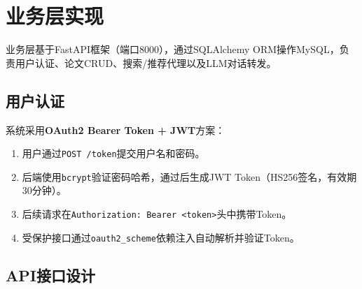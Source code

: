 \documentclass[12pt,a4paper]{ctexart}
\newcommand{\code}[1]{\texttt{#1}}
\newcommand{\api}[1]{\texttt{#1}}
\begin{document}
\section{业务层实现}

业务层基于FastAPI框架（端口8000），通过SQLAlchemy ORM操作MySQL，负责用户认证、论文CRUD、搜索/推荐代理以及LLM对话转发。

\subsection{用户认证}

系统采用\textbf{OAuth2 Bearer Token + JWT}方案：

\begin{enumerate}
\item 用户通过\api{POST /token}提交用户名和密码。
\item 后端使用\code{bcrypt}验证密码哈希，通过后生成JWT Token（HS256签名，有效期30分钟）。
\item 后续请求在\code{Authorization: Bearer <token>}头中携带Token。
\item 受保护接口通过\code{oauth2\_scheme}依赖注入自动解析并验证Token。
\end{enumerate}

\subsection{API接口设计}
\end{document}
